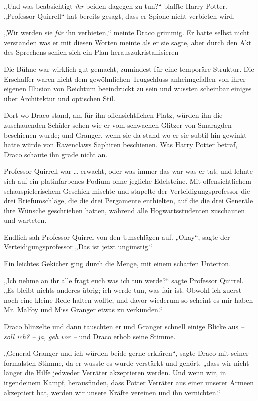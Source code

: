 {„Und was beabsichtigt \emph{ihr} beiden dagegen zu tun?“ blaffte Harry Potter. „Professor Quirrell“ hat bereits gesagt, dass er Spione nicht verbieten wird.

„Wir werden sie \emph{für} ihn verbieten,“ meinte Draco grimmig. Er hatte selbst nicht verstanden was er mit diesen Worten meinte als er sie sagte, aber durch den Akt des Sprechens schien sich ein Plan herauszukristallisieren --

Die Bühne war wirklich gut gemacht, zumindest für eine temporäre Struktur. Die Erschaffer waren nicht dem gewöhnlichen Trugschluss anheimgefallen von ihrer eigenen Illusion von Reichtum beeindruckt zu sein und wussten scheinbar einiges über Architektur und optischen Stil.

Dort wo Draco stand, am für ihn offensichtlichen Platz, würden ihn die zuschauenden Schüler sehen wie er vom schwachen Glitzer von Smaragden beschienen wurde; und Granger, wenn sie da stand wo er sie subtil hin gewinkt hatte würde von Ravenclaws Saphiren beschienen. Was Harry Potter betraf, Draco schaute ihn grade nicht an.

Professor Quirrell war … erwacht, oder was immer das war was er tat; und lehnte sich auf ein platinfarbenes Podium ohne jegliche Edelsteine. Mit offensichtlichem schauspielerischem Geschick mischte und stapelte der Verteidigungsprofessor die drei Briefumschläge, die die drei Pergamente enthielten, auf die die drei Generäle ihre Wünsche geschrieben hatten, während alle Hogwartsstudenten zuschauten und warteten.

Endlich sah Professor Quirrel von den Umschlägen auf. „Okay“, sagte der Verteidigungsprofessor „Das ist jetzt ungünstig.“

Ein leichtes Gekicher ging durch die Menge, mit einem scharfen Unterton.

„Ich nehme an ihr alle fragt euch was ich tun werde?“ sagte Professor Quirrel. „Es bleibt nichts anderes übrig; ich werde tun, was fair ist. Obwohl ich zuerst noch eine kleine Rede halten wollte, und davor wiederum so scheint es mir haben Mr. Malfoy und Miss Granger etwas zu verkünden.“

Draco blinzelte und dann tauschten er und Granger schnell einige Blicke aus \emph{-- soll ich? -- ja, geh vor --} und Draco erhob seine Stimme.

„General Granger und ich würden beide gerne erklären“, sagte Draco mit seiner formalsten Stimme, da er wusste es wurde verstärkt und gehört, „dass wir nicht länger die Hilfe jedweder Verräter akzeptieren werden. Und wenn wir, in irgendeinem Kampf, herausfinden, dass Potter Verräter aus einer unserer Armeen akzeptiert hat, werden wir unsere Kräfte vereinen und ihn vernichten.“

}
